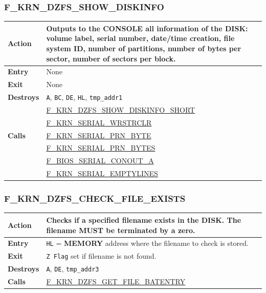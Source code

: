 \documentclass[a4paper,11pt]{article}
\begin{document}
        \subsubsection{F\_KRN\_DZFS\_SHOW\_DISKINFO}
        \label{func:fkrndzfsshowdiskinfo}
        \begin{tabular}{l p{9cm}}
            \hline\textbf{Action}
            & Outputs to the \textbf{CONSOLE} all information of the 
            \textbf{DISK}: volume label, serial number, date/time creation,
            file system ID, number of partitions, number of bytes per sector,
            number of sectors per block.\\
            \hline\textbf{Entry} & None\\
            \hline\textbf{Exit} & None\\
            \hline\textbf{Destroys} & \texttt{A}, \texttt{BC}, \texttt{DE}, 
            \texttt{HL}, \texttt{tmp\_addr1}\\
            \hline\multirow[t]{5}{4em}{\textbf{Calls}}
            & \hyperref[func:fkrndzfsshowdiskinfoshort]{F\_KRN\_DZFS\_SHOW\_DISKINFO\_SHORT}\\
            & \hyperref[func:fkrnserialwrstrclr]{F\_KRN\_SERIAL\_WRSTRCLR}\\
            & \hyperref[func:fkrnserialprnbyte]{F\_KRN\_SERIAL\_PRN\_BYTE}\\
            & \hyperref[func:fkrnserialprnbytes]{F\_KRN\_SERIAL\_PRN\_BYTES}\\
            & \hyperref[func:fbiosserialconouta]{F\_BIOS\_SERIAL\_CONOUT\_A}\\
            & \hyperref[func:fkrnserialemptylines]{F\_KRN\_SERIAL\_EMPTYLINES}\\
            \hline
        \end{tabular}

        \subsubsection{F\_KRN\_DZFS\_CHECK\_FILE\_EXISTS}
        \label{func:fkrndzfscheckfileexists}
        \begin{tabular}{l p{9cm}}
            \hline\textbf{Action}
            & Checks if a specified filename exists in the \textbf{DISK}. The
            filename MUST be terminated by a zero.\\
            \hline\textbf{Entry} & \texttt{HL} = \textbf{MEMORY} address where
            the filename to check is stored.\\
            \hline\textbf{Exit} & \texttt{Z Flag} set if filename is not found.\\
            \hline\textbf{Destroys} & \texttt{A}, \texttt{DE}, \texttt{tmp\_addr3}\\
            \hline\textbf{Calls}
            & \hyperref[func:fkrndzfsgetfilebatentry]{F\_KRN\_DZFS\_GET\_FILE\_BATENTRY}\\
            \hline
        \end{tabular}
\end{document}

